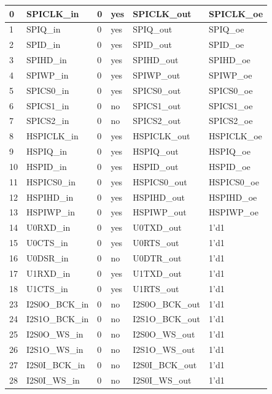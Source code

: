 \begin{longtable}[c]{|p{1cm}|p{3.3cm}|p{1.5cm}|p{2.4cm}|p{4.3cm}|p{2.5cm}| }
    0 & SPICLK\_in & 0 & yes & SPICLK\_out & SPICLK\_oe \\ \hline
    1 & SPIQ\_in & 0 & yes & SPIQ\_out & SPIQ\_oe \\ \hline
    2 & SPID\_in & 0 & yes & SPID\_out & SPID\_oe \\ \hline
    3 & SPIHD\_in & 0 & yes & SPIHD\_out & SPIHD\_oe \\ \hline
    4 & SPIWP\_in & 0 & yes & SPIWP\_out & SPIWP\_oe \\ \hline
    5 & SPICS0\_in & 0 & yes & SPICS0\_out & SPICS0\_oe \\ \hline
    6 & SPICS1\_in & 0 & no & SPICS1\_out & SPICS1\_oe \\ \hline
    7 & SPICS2\_in & 0 & no & SPICS2\_out & SPICS2\_oe \\ \hline
    8 & HSPICLK\_in & 0 & yes & HSPICLK\_out & HSPICLK\_oe \\ \hline
    9 & HSPIQ\_in & 0 & yes & HSPIQ\_out & HSPIQ\_oe \\ \hline
    10 & HSPID\_in & 0 & yes & HSPID\_out & HSPID\_oe \\ \hline
    11 & HSPICS0\_in & 0 & yes & HSPICS0\_out & HSPICS0\_oe \\ \hline
    12 & HSPIHD\_in & 0 & yes & HSPIHD\_out & HSPIHD\_oe \\ \hline
    13 & HSPIWP\_in & 0 & yes & HSPIWP\_out & HSPIWP\_oe \\ \hline
    14 & U0RXD\_in & 0 & yes & U0TXD\_out & 1'd1 \\ \hline
    15 & U0CTS\_in & 0 & yes & U0RTS\_out & 1'd1 \\ \hline
    16 & U0DSR\_in & 0 & no & U0DTR\_out & 1'd1 \\ \hline
    17 & U1RXD\_in & 0 & yes & U1TXD\_out & 1'd1 \\ \hline
    18 & U1CTS\_in & 0 & yes & U1RTS\_out & 1'd1 \\ \hline
    23 & I2S0O\_BCK\_in & 0 & no & I2S0O\_BCK\_out & 1'd1 \\ \hline
    24 & I2S1O\_BCK\_in & 0 & no & I2S1O\_BCK\_out & 1'd1 \\ \hline
    25 & I2S0O\_WS\_in & 0 & no & I2S0O\_WS\_out & 1'd1 \\ \hline
    26 & I2S1O\_WS\_in & 0 & no & I2S1O\_WS\_out & 1'd1 \\ \hline
    27 & I2S0I\_BCK\_in & 0 & no & I2S0I\_BCK\_out & 1'd1 \\ \hline
    28 & I2S0I\_WS\_in & 0 & no & I2S0I\_WS\_out & 1'd1 \\ \hline

\end{longtable}
